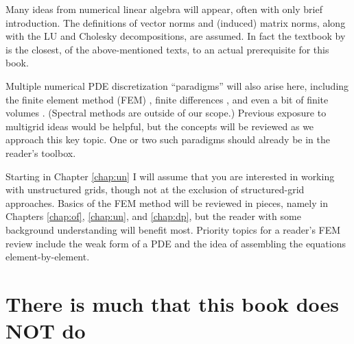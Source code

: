 Many ideas from numerical linear algebra \citep{Greenbaum1997,TrefethenBau1997} will appear, often with only brief introduction.  The definitions of vector norms and (induced) matrix norms, along with the LU and Cholesky decompositions, are assumed.  In fact the textbook by \citet{TrefethenBau1997} is the closest, of the above-mentioned texts, to an actual prerequisite for this book.

Multiple numerical PDE discretization ``paradigms'' will also arise here, including the finite element method (FEM) \citep{Braess2007,Elmanetal2005,KarniadakisSherwin2013}, finite differences \citep{LeVeque2007,MortonMayers2005}, and even a bit of finite volumes \citep{LeVeque2002}.  (Spectral methods \citep{Trefethen2000} are outside of our scope.)  Previous exposure to multigrid ideas \citep{Briggsetal2000} would be helpful, but the concepts will be reviewed as we approach this key topic.  One or two such paradigms should already be in the reader's toolbox.

Starting in Chapter \ref{chap:un} I will assume that you are interested in working with unstructured grids, though not at the exclusion of structured-grid approaches.  Basics of the FEM method will be reviewed in pieces, namely in Chapters \ref{chap:of}, \ref{chap:un}, and \ref{chap:dp}, but the reader with some background understanding will benefit most.  Priority topics for a reader's FEM review include the weak form of a PDE and the idea of assembling the equations element-by-element.


\section{There is much that this book does NOT do}

